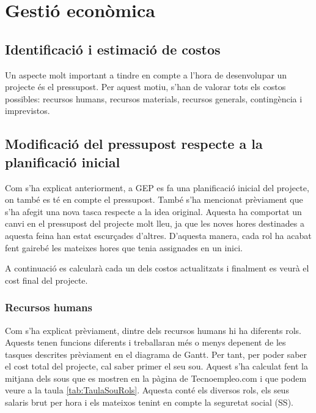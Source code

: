 \documentclass[a4paper]{article}
\begin{document}
\newpage
\section{Gestió econòmica}
\subsection{Identificació i estimació de costos}
Un aspecte molt important a tindre en compte a l'hora de desenvolupar un projecte és el pressupost. Per aquest motiu, s'han de valorar tots els costos possibles: recursos humans, recursos materials, recursos generals, contingència i imprevistos. 

\subsection{Modificació del pressupost respecte a la planificació inicial}
Com s'ha explicat anteriorment, a GEP es fa una planificació inicial del projecte, on també es té en compte el pressupost. També s'ha mencionat prèviament que s'ha afegit una nova tasca respecte a la idea original. Aquesta ha comportat un canvi en el pressupost del projecte molt lleu, ja que les noves hores destinades a aquesta feina han estat escurçades d'altres. D'aquesta manera, cada rol ha acabat fent gairebé les mateixes hores que tenia assignades en un inici.

A continuació es calcularà cada un dels costos actualitzats i finalment es veurà el cost final del projecte.

\subsubsection{Recursos humans}
Com s'ha explicat prèviament, dintre dels recursos humans hi ha diferents rols. Aquests tenen funcions diferents i treballaran més o menys depenent de les tasques descrites prèviament en el diagrama de Gantt. Per tant, per poder saber el cost total del projecte, cal saber primer el seu sou. Aquest s'ha calculat fent la  mitjana dels sous que es mostren en la pàgina de Tecnoempleo.com \cite{tecnoEmpleo} i que podem veure a la taula \ref{tab:TaulaSouRols}. Aquesta conté els diversos rols, els seus salaris brut per hora i els mateixos tenint en compte la seguretat social (SS). 
\end{document}
